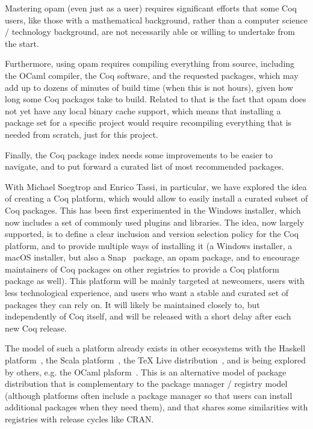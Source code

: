 Mastering opam (even just as a user) requires significant efforts that some Coq users, like those with a mathematical background, rather than a computer science / technology background, are not necessarily able or willing to undertake from the start.

Furthermore, using opam requires compiling everything from source, including the OCaml compiler, the Coq software, and the requested packages, which may add up to dozens of minutes of build time (when this is not hours), given how long some Coq packages take to build.
Related to that is the fact that opam does not yet have any local binary cache support, which means that installing a package set for a specific project would require recompiling everything that is needed from scratch, just for this project.

Finally, the Coq package index needs some improvements to be easier to navigate, and to put forward a curated list of most recommended packages.

With Michael Soegtrop and Enrico Tassi, in particular, we have explored the idea of creating a Coq platform, which would allow to easily install a curated subset of Coq packages.
This has been first experimented in the Windows installer, which now includes a set of commonly used plugins and libraries.
The idea, now largely supported, is to define a clear inclusion and version selection policy for the Coq platform, and to provide multiple ways of installing it (a Windows installer, a macOS installer, but also a Snap~\cite{snap} package, an opam package, and to encourage maintainers of Coq packages on other registries to provide a Coq platform package as well).
This platform will be mainly targeted at newcomers, users with less technological experience, and users who want a stable and curated set of packages they can rely on.
It will likely be maintained closely to, but independently of Coq itself, and will be released with a short delay after each new Coq release.

The model of such a platform already exists in other ecosystems with the Haskell platform~\cite{haskellplatform}, the Scala platform~\cite{scala_platform}, the TeX Live distribution~\cite{texlive}, and is being explored by others, e.g. the OCaml plaform~\cite{ocaml_platform}.
This is an alternative model of package distribution that is complementary to the package manager / registry model (although platforms often include a package manager so that users can install additional packages when they need them), and that shares some similarities with registries with release cycles like CRAN.

